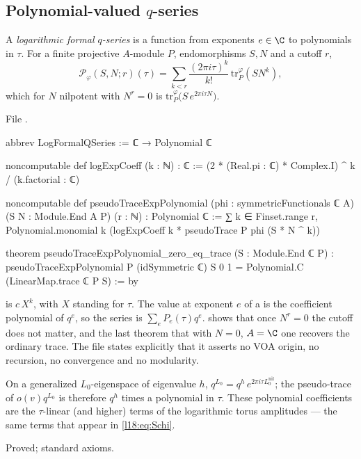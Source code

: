 \subsection{Polynomial-valued \texorpdfstring{$q$}{q}-series}

\begin{definition}\label{l18:def:logq}
A \emph{logarithmic formal $q$-series} is a function from exponents $e\in\C$ to polynomials in $\tau$. For a finite
projective $A$-module $P$, endomorphisms $S,N$ and a cutoff $r$,
\begin{equation*}
\mathcal P_\varphi(S,N;r)(\tau)=\sum_{k<r}\frac{(2\pi i\tau)^k}{k!}\,\mathrm{tr}^\varphi_P(S N^k),
\end{equation*}
which for $N$ nilpotent with $N^r=0$ is $\mathrm{tr}^\varphi_P\bigl(S\,e^{2\pi i\tau N}\bigr)$.
\end{definition}
\noindent File .
\begin{leancode}
abbrev LogFormalQSeries := ℂ → Polynomial ℂ

noncomputable def logExpCoeff (k : ℕ) : ℂ :=
  (2 * (Real.pi : ℂ) * Complex.I) ^ k / (k.factorial : ℂ)

noncomputable def pseudoTraceExpPolynomial (phi : symmetricFunctionals ℂ A)
    (S N : Module.End A P) (r : ℕ) : Polynomial ℂ :=
  ∑ k ∈ Finset.range r,
    Polynomial.monomial k (logExpCoeff k * pseudoTrace P phi (S * N ^ k))

theorem pseudoTraceExpPolynomial_zero_eq_trace (S : Module.End ℂ P) :
    pseudoTraceExpPolynomial P (idSymmetric ℂ) S 0 1 =
      Polynomial.C (LinearMap.trace ℂ P S) := by
\end{leancode}
\begin{dictionary}
 is $c\,X^k$, with $X$ standing for $\tau$. The value at exponent $e$ of a
 is the coefficient polynomial of $q^e$, so the series is $\sum_eP_e(\tau)q^e$.
 shows that once $N^r=0$ the cutoff does not matter, and the last theorem
that with $N=0$, $A=\C$ one recovers the ordinary trace. The file states explicitly that it asserts no VOA origin,
no recursion, no convergence and no modularity.
\end{dictionary}
\begin{physics}
On a generalized $L_0$-eigenspace of eigenvalue $h$, $q^{L_0}=q^h\,e^{2\pi i\tau L_0^{\mathrm{nil}}}$; the pseudo-trace of
$o(v)q^{L_0}$ is therefore $q^h$ times a polynomial in $\tau$. These polynomial coefficients are the $\tau$-linear
(and higher) terms of the logarithmic torus amplitudes --- the same terms that appear in \eqref{l18:eq:Schi}.
\end{physics}
\begin{status}
Proved; standard axioms.
\end{status}

